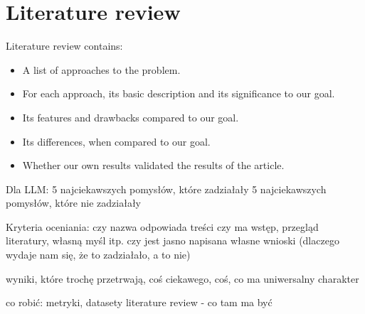 \section{Literature review}
Literature review contains:
\begin{itemize}
	\item A list of approaches to the problem.
	\item For each approach, its basic description and its significance to our goal.
	\item Its features and drawbacks compared to our goal.
	\item Its differences, when compared to our goal.
	\item Whether our own results validated the results of the article.
\end{itemize}


Dla LLM:
5 najciekawszych pomysłów, które zadziałały
5 najciekawszych pomysłów, które nie zadziałały

Kryteria oceniania:
czy nazwa odpowiada treści
czy ma wstęp, przegląd literatury, własną myśl itp.
czy jest jasno napisana
własne wnioski (dlaczego wydaje nam się, że to zadziałało, a to nie)

wyniki, które trochę przetrwają, coś ciekawego, coś, co ma uniwersalny charakter

co robić:
metryki, datasety
literature review - co tam ma być
